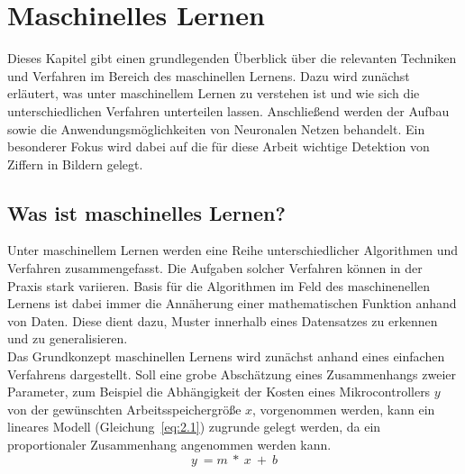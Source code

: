 
\section{Maschinelles Lernen}\label{sec:Machine Learning}
    Dieses Kapitel gibt einen grundlegenden Überblick über die relevanten Techniken und Verfahren im Bereich des maschinellen Lernens. Dazu wird zunächst erläutert, was unter maschinellem Lernen zu verstehen ist und wie sich die unterschiedlichen Verfahren unterteilen lassen. Anschließend werden der Aufbau sowie die Anwendungsmöglichkeiten von Neuronalen Netzen behandelt. Ein besonderer Fokus wird dabei auf die für diese Arbeit wichtige Detektion von Ziffern in Bildern gelegt.
\subsection{Was ist maschinelles Lernen?}\label{subsec:Was ist maschninelles Lernen?}
    Unter maschinellem Lernen werden eine Reihe unterschiedlicher Algorithmen und Verfahren zusammengefasst. Die Aufgaben solcher Verfahren können in der Praxis stark variieren. Basis für die Algorithmen im Feld des maschinenellen Lernens ist dabei immer die Annäherung einer mathematischen Funktion anhand von Daten. Diese dient dazu, Muster innerhalb eines Datensatzes zu erkennen und zu generalisieren\cite{Goodfellow-et-al-2016-5}.\\ Das Grundkonzept maschinellen Lernens wird zunächst anhand eines einfachen Verfahrens dargestellt. Soll eine grobe Abschätzung eines Zusammenhangs zweier Parameter, zum Beispiel die Abhängigkeit der Kosten eines Mikrocontrollers $y$ von der gewünschten Arbeitsspeichergröße $x$, vorgenommen werden, kann ein lineares Modell (Gleichung~\ref{eq:2.1}) zugrunde gelegt werden, da ein proportionaler Zusammenhang angenommen werden kann. 
    \begin{equation}
        y\ = m\ *\ x\ +\ b
    \end{equation}\label{eq:2.1}
